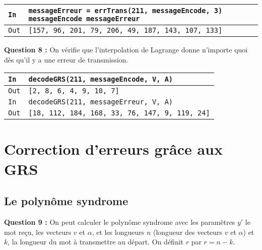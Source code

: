 \documentclass[titlepage]{article}
\begin{document}
        \begin{tabularx}{12cm}{|p{0.60cm}|X|}
            \hline
            \rowcolor{gray}
            \texttt{In}
            & 
            \texttt{messageErreur = errTrans(211, messageEncode, 3) \newline
            messageEncode \newline
            messageErreur}
            \\
            \hline
            \texttt{Out}
            &
            \texttt{[157, 96, 201, 79, 206, 49, 187, 143, 107, 133]\newline
            [157, 86, 49, 79, 206, 49, 187, 32, 107, 133]}
            \\
            \hline
        \end{tabularx}
        \bigbreak

        \textbf{Question 8 :}
        On vérifie que l'interpolation de Lagrange donne n'importe quoi dès qu'il y a une erreur de transmission.

        \begin{tabularx}{12cm}{|p{0.60cm}|X|}
            \hline
            \rowcolor{gray}
            \texttt{In}
            & 
            \texttt{decodeGRS(211, messageEncode, V, A)}
            \\
            \hline
            \texttt{Out}
            &
            \texttt{[2, 8, 6, 4, 9, 10, 7]}
            \\
            \hline
            \rowcolor{gray}
            \texttt{In}
            & 
            \texttt{decodeGRS(211, messageErreur, V, A)}
            \\
            \hline
            \texttt{Out}
            &
            \texttt{[18, 112, 184, 168, 33, 76, 147, 9, 119, 24]}
            \\
            \hline
        \end{tabularx}
        \bigbreak

    \section{Correction d’erreurs grâce aux GRS}
        \subsection{Le polynôme syndrome}
        \textbf{Question 9 :}
        On peut calculer le polynôme syndrome avec les paramètres $y'$ le mot reçu, les vecteurs $v$ et $\alpha$, 
        et les longueurs $n$ (longueur des vecteurs $v$ et $\alpha$) et $k$, la longueur du mot à transmettre au départ. 
        On définit $r$ par $r = n - k$.
\end{document}
